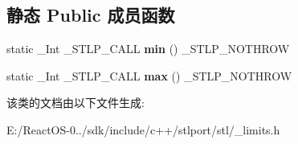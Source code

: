 \subsection*{静态 Public 成员函数}
\begin{DoxyCompactItemize}
\item 
\mbox{\label{class___integer__limits_a1ef626dfd5c45d1d7a1e038a575f3d89}} 
static \+\_\+\+Int \+\_\+\+S\+T\+L\+P\+\_\+\+C\+A\+LL {\bfseries min} () \+\_\+\+S\+T\+L\+P\+\_\+\+N\+O\+T\+H\+R\+OW
\item 
\mbox{\label{class___integer__limits_a1edd50f304fd8513bf31f0da30ce09f6}} 
static \+\_\+\+Int \+\_\+\+S\+T\+L\+P\+\_\+\+C\+A\+LL {\bfseries max} () \+\_\+\+S\+T\+L\+P\+\_\+\+N\+O\+T\+H\+R\+OW
\end{DoxyCompactItemize}


该类的文档由以下文件生成\+:\begin{DoxyCompactItemize}
\item 
E\+:/\+React\+O\+S-\/0../sdk/include/c++/stlport/stl/\+\_\+limits.\+h\end{DoxyCompactItemize}

